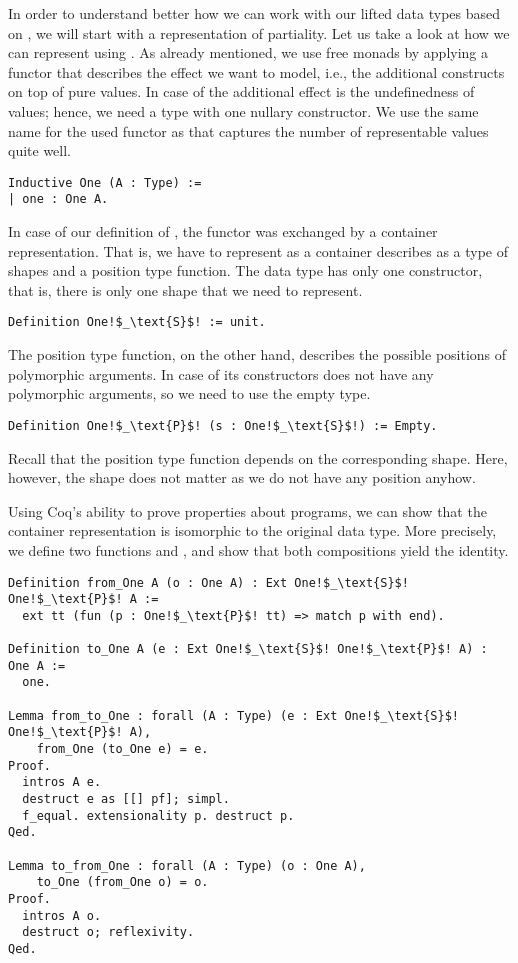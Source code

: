 In order to understand better how we can work with our lifted data
types based on , we will start with a representation of
partiality.
Let us take a look at how we can represent  using
.
As already mentioned, we use free monads by applying a functor
 that describes the effect we want to model, i.e., the
additional constructs on top of pure values.
In case of  the additional effect is the undefinedness
of values; hence, we need a type with one nullary constructor.
We use the same name for the used functor as \citet{swierstra2008data}
that captures the number of representable values quite well.

\begin{verbatim}
Inductive One (A : Type) :=
| one : One A.
\end{verbatim}

In case of our definition of , the functor was exchanged by
a container representation.
That is, we have to represent  as a container
describes as a type of shapes and a position type function.
The data type  has only one constructor, that is,
there is only one shape that we need to represent.

\begin{verbatim}
Definition One!$_\text{S}$! := unit.
\end{verbatim}

The position type function, on the other hand, describes the possible
positions of polymorphic arguments.
In case of  its constructors does not have any
polymorphic arguments, so we need to use the empty type.

\begin{verbatim}
Definition One!$_\text{P}$! (s : One!$_\text{S}$!) := Empty.
\end{verbatim}

Recall that the position type function depends on the corresponding
shape.
Here, however, the shape does not matter as we do not have any
position anyhow.

Using Coq's ability to prove properties about programs, we can show
that the container representation is isomorphic to the original data
type.
More precisely, we define two functions  and
, and show that both compositions yield the
identity.

\begin{verbatim}
Definition from_One A (o : One A) : Ext One!$_\text{S}$! One!$_\text{P}$! A :=
  ext tt (fun (p : One!$_\text{P}$! tt) => match p with end).

Definition to_One A (e : Ext One!$_\text{S}$! One!$_\text{P}$! A) : One A :=
  one.

Lemma from_to_One : forall (A : Type) (e : Ext One!$_\text{S}$! One!$_\text{P}$! A),
    from_One (to_One e) = e.
Proof.
  intros A e.
  destruct e as [[] pf]; simpl.
  f_equal. extensionality p. destruct p.
Qed.

Lemma to_from_One : forall (A : Type) (o : One A),
    to_One (from_One o) = o.
Proof.
  intros A o.
  destruct o; reflexivity.
Qed.\end{verbatim}


